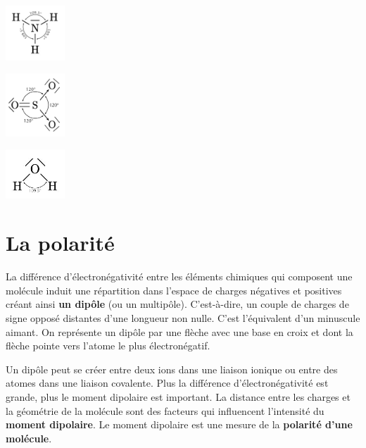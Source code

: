 \documentclass[
  11pt,
  a4paper,
  openany]{book}
\begin{document}
\begin{Answer}

\begin{multicols}{3}
\includegraphics[width=6em,height=\textheight]{exe/molecules-10-NH3.png}

\includegraphics[width=6em,height=\textheight]{exe/molecules-10-SO3.png}

\includegraphics[width=6em,height=\textheight]{exe/molecules-10-H2O.png}

\end{multicols}

\end{Answer}

\newpage

\section{La polarité}\label{la-polarituxe9}

La différence d'électronégativité entre les éléments chimiques qui composent une molécule induit une répartition dans l'espace de charges négatives et positives créant ainsi \textbf{un dipôle} (ou un multipôle). C'est-à-dire, un couple de charges de signe opposé distantes d'une longueur non nulle. C'est l'équivalent d'un minuscule aimant. On représente un dipôle par une flèche avec une base en croix et dont la flèche pointe vers l'atome le plus électronégatif.

Un dipôle peut se créer entre deux ions dans une liaison ionique ou entre des atomes dans une liaison covalente. Plus la différence d'électronégativité est grande, plus le moment dipolaire est important. La distance entre les charges et la géométrie de la molécule sont des facteurs qui influencent l'intensité du \textbf{moment dipolaire}. Le moment dipolaire est une mesure de la \textbf{polarité d'une molécule}.
\end{document}

